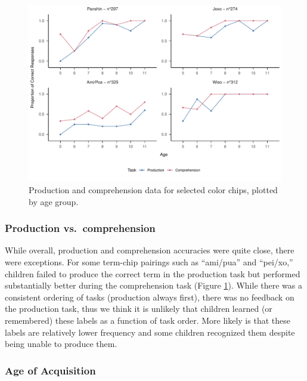 \documentclass[
  english,
  ,apa7,floatsintext]{apa6}
\begin{document}
\begin{figure}
\centering
\includegraphics{amazon_color_files/figure-latex/study2-task-compare-plot-1.pdf}
\caption{\label{fig:study2-task-compare-plot}Production and comprehension data for selected color chips, plotted by age group.}
\end{figure}

\hypertarget{production-vs.-comprehension}{%
\subsubsection{Production vs.~comprehension}\label{production-vs.-comprehension}}

While overall, production and comprehension accuracies were quite close, there were exceptions. For some term-chip pairings such as ``ami/pua'' and ``pei/xo,'' children failed to produce the correct term in the production task but performed substantially better during the comprehension task (Figure \ref{fig:study2-task-compare-plot}). While there was a consistent ordering of tasks (production always first), there was no feedback on the production task, thus we think it is unlikely that children learned (or remembered) these labels as a function of task order. More likely is that these labels are relatively lower frequency and some children recognized them despite being unable to produce them.

\hypertarget{age-of-acquisition}{%
\subsubsection{Age of Acquisition}\label{age-of-acquisition}}
\end{document}
